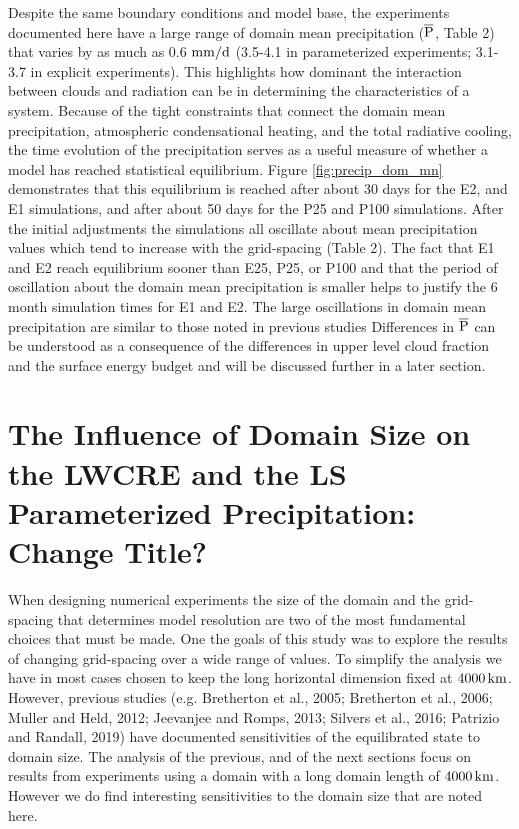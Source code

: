 \documentclass[draft]{agujournal2019}
\begin{document}
Despite the same boundary conditions and model base, the experiments documented here have a
large range of domain mean precipitation ($\rm{\overline{P}}$, Table 2) that varies by as much as 
0.6 $\rm{mm/d}$ (3.5-4.1 in parameterized experiments; 3.1-3.7 in explicit experiments).
This highlights how dominant the interaction between clouds and radiation can be in determining the 
characteristics of a system.
Because of the tight constraints that connect the domain mean precipitation, atmospheric condensational heating, and 
the total radiative cooling, the time evolution of the precipitation serves as a useful measure of whether a model has 
reached statistical equilibrium.  Figure \ref{fig:precip_dom_mn} demonstrates that this equilibrium is reached after about 30 
days for the E2, and E1 simulations, and after about 50 days for the P25 and P100 simulations.   After the initial adjustments
the simulations all oscillate about mean precipitation values which tend to increase with the grid-spacing 
(Table 2).   The fact that E1 and E2 reach equilibrium sooner than E25, P25, or P100 and that the period of oscillation 
about the domain mean precipitation is smaller helps to justify the 6 month simulation times for E1 and E2.  
The large oscillations in domain mean precipitation are similar to those noted in previous studies 
\cite{Silvers2016, Patrizio2019}
Differences in $\rm{\overline{P}}$ can be understood as a consequence of the differences in upper level cloud fraction 
and the surface energy budget and will be discussed further in a later section.   



\section{The Influence of Domain Size on the LWCRE and the LS Parameterized Precipitation: Change Title?}

When designing numerical experiments the size of the domain and the grid-spacing that determines model resolution are 
two of the most fundamental choices that must be made.   One the goals of this study was to explore the results of 
changing grid-spacing over a wide range of values.  To simplify the analysis we have in most cases chosen to keep the 
long horizontal dimension fixed at $4000\, \rm{km}$.  However, previous studies 
\cite{Bretherton2005, Bretherton2006, Muller2012, Jeevanjee2013, Silvers2016, Patrizio2019}
(e.g. Bretherton et al., 2005; Bretherton et al., 2006; Muller and Held, 2012; Jeevanjee and Romps, 2013; 
Silvers et al., 2016; Patrizio and Randall, 2019) have 
documented sensitivities of the equilibrated state to domain size.   
The analysis of the previous, and of the next sections focus on results from 
experiments using a domain with a long domain length of $4000 \, \rm{km}$.  However we do find interesting 
sensitivities to the domain size that are noted here. 
\end{document}
